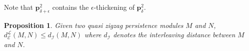 \documentclass{article}
\newcommand{\qzzmod}{quasi zigzag persistence module}
\newcommand{\RKG}{\mathsf{rk}}
\newcommand{\RR}{\mathbb{R}}
\newcommand{\vp}{\mathbf{p}}
\newcommand{\zz}{\mathbb{ZZ}}
\newcommand{\z}{\mathbb{Z}}
\theoremstyle{plain}
\newtheorem{proposition}[theorem]{Proposition}
\theoremstyle{definition}
\newtheorem{definition}[theorem]{Definition}
\theoremstyle{remark}
\newcommand{\Shreyas}[1]		{{ \textcolor{orange} {S: #1}}}
\begin{document}


Note that $\boxed{\vp}^2_{\delta+\epsilon}$ contains the $\epsilon$-thickening of $\boxed{\vp}^2_{\delta}$. 






\begin{proposition}\label{prop:interleaving}
    Given two \qzzmod s $M$ and $N$, $d_\mathcal{E}^{\mathcal{L}}(M,N) \leq d_\mathcal{I}(M,N)$ where $d_\mathcal{I}$ denotes the interleaving distance between $M$ and $N$.
\end{proposition}
\vspace{-0.2cm}

\end{document}
